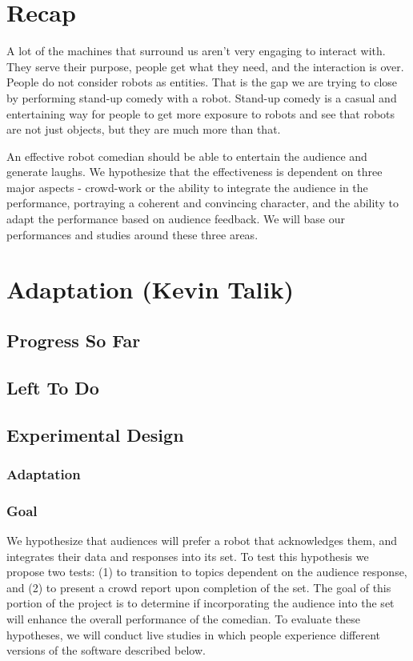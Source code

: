 \documentclass[onecolumn, draftclsnofoot,10pt, compsoc]{IEEEtran}
\begin{document}
\section{Recap}

A lot of the machines that surround us aren't very engaging to interact with. They serve their purpose, people get what they need, and the interaction is over. People do not consider robots as entities. That is the gap we are trying to close by performing stand-up comedy with a robot. Stand-up comedy is a casual and entertaining way for people to get more exposure to robots and see that robots are not just objects, but they are much more than that.

An effective robot comedian should be able to entertain the audience and generate laughs. We hypothesize that the effectiveness is dependent on three major aspects - crowd-work or the ability to integrate the audience in the performance, portraying a coherent and convincing character, and the ability to adapt the performance based on audience feedback. We will base our performances and studies around these three areas.

\section{Adaptation (Kevin Talik)}
\subsection{Progress So Far}
\subsection{Left To Do}
\subsection{Experimental Design}
\subsubsection{Adaptation}
\subsubsection{Goal}
  We hypothesize that audiences will prefer a robot that acknowledges them, and integrates their data and responses into its set. To test this hypothesis we propose two tests: (1) to transition to topics dependent on the
  audience response, and (2) to present a crowd report upon completion of the set. The goal of this portion of the project is to determine if incorporating the audience into the set will enhance the overall performance of the comedian. To evaluate these hypotheses, we will conduct live studies in which people experience different versions of the software described below.
\end{document}
